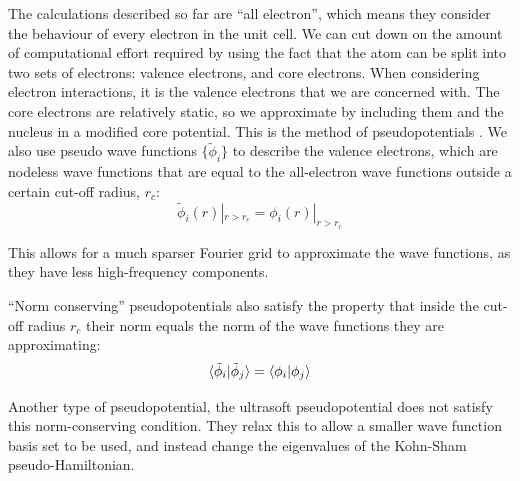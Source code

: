 \documentclass[12pt]{article}
\begin{document}
The calculations described so far are ``all electron'', which means they consider the behaviour of every electron in the unit cell. We can cut down on the amount of computational effort required by using the fact that the atom can be split into two sets of electrons: valence electrons, and core electrons. 
When considering electron interactions, it is the valence electrons that we are concerned with. The core electrons are relatively static, so we approximate by including them and the nucleus in a modified core potential. 
This is the method of pseudopotentials \cite{schwerdtfeger2011pseudopotential}.
We also use pseudo wave functions $\{\tilde \phi_i\}$ to describe the valence electrons, which are nodeless wave functions that are equal to the all-electron wave functions outside a certain cut-off radius, $r_c$:
\begin{equation}\label{eq:pseudo_wavefunction}
	\tilde \phi_i(r)|_{r>r_c} = \phi_i(r)|_{r>r_c}
\end{equation}

This allows for a much sparser Fourier grid to approximate the wave functions, as they have less high-frequency components.

``Norm conserving'' pseudopotentials also satisfy the property that inside the cut-off radius $r_c$ their norm equals the norm of the wave functions they are approximating:
\begin{equation}\label{eq:norm_conserving}
	\braket{\tilde \phi_i | \tilde \phi_j} = \braket{\phi_i | \phi_j}
\end{equation}

Another type of pseudopotential, the ultrasoft pseudopotential \cite{vanderbilt1990soft} does not satisfy this norm-conserving condition. They relax this to allow a smaller wave function basis set to be used, and instead change the eigenvalues of the Kohn-Sham pseudo-Hamiltonian.
\end{document}
